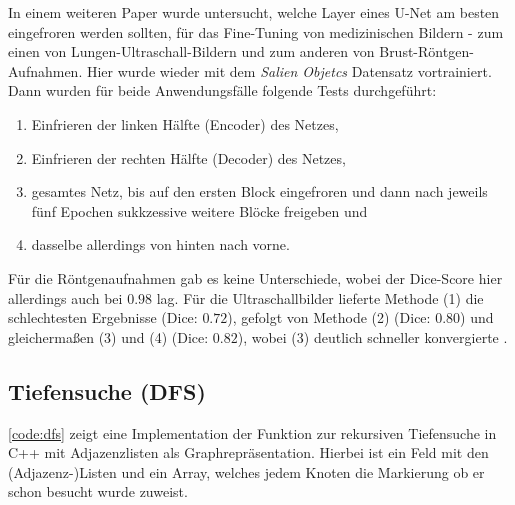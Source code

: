 In einem weiteren Paper wurde untersucht, welche Layer eines U-Net am besten eingefroren werden sollten, für das Fine-Tuning von medizinischen Bildern - 
zum einen von Lungen-Ultraschall-Bildern und zum anderen von Brust-Röntgen-Aufnahmen. 
Hier wurde wieder mit dem \textit{Salien Objetcs} Datensatz vortrainiert. Dann wurden für beide Anwendungsfälle folgende Tests durchgeführt: 
\begin{enumerate}
	\item Einfrieren der linken Hälfte (Encoder) des Netzes,
	\item Einfrieren der rechten Hälfte (Decoder) des Netzes,
	\item gesamtes Netz, bis auf den ersten Block eingefroren und dann nach jeweils fünf Epochen sukkzessive weitere Blöcke freigeben und
	\item dasselbe allerdings von hinten nach vorne.
\end{enumerate}
Für die Röntgenaufnahmen gab es keine Unterschiede, wobei der Dice-Score hier allerdings auch bei $0.98$ lag. 
Für die Ultraschallbilder lieferte Methode (1) die schlechtesten Ergebnisse (Dice: $0.72$), gefolgt von Methode (2) (Dice: $0.80$) 
und gleichermaßen (3) und (4) (Dice: $0.82$), wobei (3) deutlich schneller konvergierte \cite{Amiri.19.02.2020}.


\subsection{Tiefensuche (DFS)}

\autoref{code:dfs} zeigt eine Implementation der Funktion zur rekursiven Tiefensuche in C++ mit Adjazenzlisten als Graphrepräsentation. Hierbei ist  ein Feld mit den (Adjazenz-)Listen und  ein Array, welches jedem Knoten die Markierung ob er schon besucht wurde zuweist.

